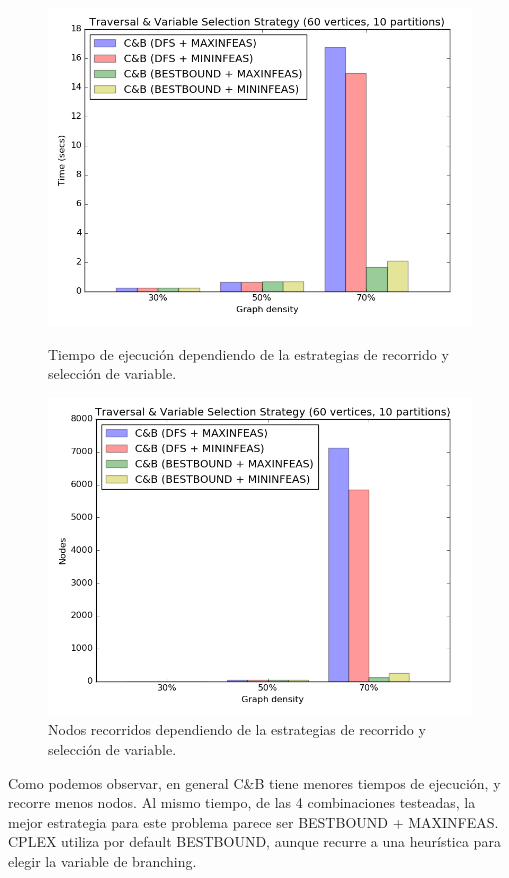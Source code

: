 \begin{figure}[h]
\begin{minipage}[b]{0.49\textwidth}
    \includegraphics[width=\textwidth]{img/9-tree_v60_p10_i1_l30_s2.png}
  \caption{Tiempo de ejecución dependiendo de la estrategias de recorrido y selección de variable.}
  \end{minipage}
  \hfill
  \begin{minipage}[b]{0.49\textwidth}
    \includegraphics[width=\textwidth]{img/9-tree_v60_p10_i1_l30_s2_nodes.png}
  \caption{Nodos recorridos dependiendo de la estrategias de recorrido y selección de variable.}
  \end{minipage}
\end{figure}

Como podemos observar, en general C\&B tiene menores tiempos de ejecución, y recorre menos nodos. Al mismo tiempo, de las 4 combinaciones testeadas, la mejor estrategia para este problema parece ser BESTBOUND + MAXINFEAS. CPLEX utiliza por default BESTBOUND, aunque recurre a una heurística para elegir la variable de branching. 


